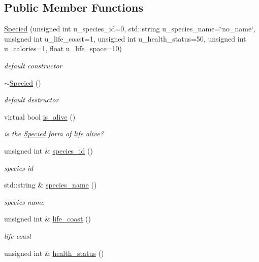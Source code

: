 \subsection*{Public Member Functions}
\begin{DoxyCompactItemize}
\item 
\hyperlink{classSpecied_aac5df03c9c0747691be7ff686d349da1}{Specied} (unsigned int u\_\-species\_\-id=0, std::string u\_\-species\_\-name=\char`\"{}no\_\-name\char`\"{}, unsigned int u\_\-life\_\-coast=1, unsigned int u\_\-health\_\-status=50, unsigned int u\_\-calories=1, float u\_\-life\_\-space=10)
\begin{DoxyCompactList}\small\item\em default constructor \end{DoxyCompactList}\item 
\hyperlink{classSpecied_aacc4458e62ccc9970178e8a40b703627}{$\sim$Specied} ()
\begin{DoxyCompactList}\small\item\em default destructor \end{DoxyCompactList}\item 
virtual bool \hyperlink{classSpecied_a2173ab978d5cd2c2de4e25a4d6eb3152}{is\_\-alive} ()
\begin{DoxyCompactList}\small\item\em is the \hyperlink{classSpecied}{Specied} form of life alive? \end{DoxyCompactList}\item 
unsigned int \& \hyperlink{classSpecied_a62459b7ffe5370668aeaa764786cc8cf}{species\_\-id} ()
\begin{DoxyCompactList}\small\item\em species id \end{DoxyCompactList}\item 
std::string \& \hyperlink{classSpecied_a104b980371c060ad8313ea0ef0a255d7}{species\_\-name} ()
\begin{DoxyCompactList}\small\item\em species name \end{DoxyCompactList}\item 
unsigned int \& \hyperlink{classSpecied_aa8cb3958e201a0689556c67df23ba38d}{life\_\-coast} ()
\begin{DoxyCompactList}\small\item\em life coast \end{DoxyCompactList}\item 
unsigned int \& \hyperlink{classSpecied_af53fa4047bf53367fe44c4a050863592}{health\_\-status} ()

\end{DoxyCompactItemize}
